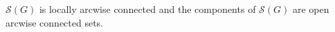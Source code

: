 $\mathcal{S}(G)$ is locally arcwise connected and the components of $\mathcal{S}(G)$ are open arcwise connected sets.
